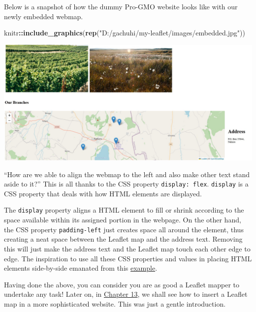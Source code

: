 \documentclass[
]{book}
\newenvironment{Shaded}{\begin{snugshade}}{\end{snugshade}}
\newcommand{\FunctionTok}[1]{\textcolor[rgb]{0.13,0.29,0.53}{\textbf{#1}}}
\newcommand{\NormalTok}[1]{#1}
\newcommand{\SpecialCharTok}[1]{\textcolor[rgb]{0.81,0.36,0.00}{\textbf{#1}}}
\newcommand{\StringTok}[1]{\textcolor[rgb]{0.31,0.60,0.02}{#1}}
\begin{document}
Below is a snapshot of how the dummy Pro-GMO website looks like with our newly embedded webmap.

\begin{Shaded}
\begin{Highlighting}[]
\NormalTok{knitr}\SpecialCharTok{::}\FunctionTok{include\_graphics}\NormalTok{(}\FunctionTok{rep}\NormalTok{(}\StringTok{"D:/gachuhi/my{-}leaflet/images/embedded.jpg"}\NormalTok{))}
\end{Highlighting}
\end{Shaded}

\includegraphics{../images/embedded.jpg}

``How are we able to align the webmap to the left and also make other text stand aside to it?'' This is all thanks to the CSS property \texttt{display:\ flex}. \texttt{display} is a CSS property that deals with how HTML elements are displayed.

The \texttt{display} property aligns a HTML element to fill or shrink according to the space available within its assigned portion in the webpage. On the other hand, the CSS property \texttt{padding-left} just creates space all around the element, thus creating a neat space between the Leaflet map and the address text. Removing this will just make the address text and the Leaflet map touch each other edge to edge. The inspiration to use all these CSS properties and values in placing HTML elements side-by-side emanated from this \href{https://www.w3docs.com/snippets/css/how-to-vertically-align-text-next-to-an-image.html?utm_source=pocket_saves}{example}.

Having done the above, you can consider you are as good a Leaflet mapper to undertake any task! Later on, in \protect\hyperlink{standard-website-with-leaflet-project}{Chapter 13}, we shall see how to insert a Leaflet map in a more sophisticated website. This was just a gentle introduction.
\end{document}
